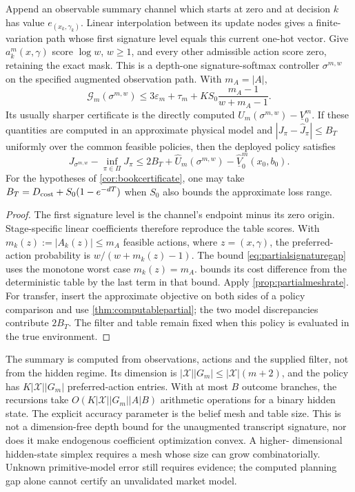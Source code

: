 \begin{corollary}
\label{cor:partialsignature}
Append an observable summary channel which starts at zero and at decision
$k$ has value $e_{(x_k,\gamma_k)}$. Linear interpolation between its update
nodes gives a finite-variation path whose first signature level equals this
current one-hot vector. Give $a_k^m(x,\gamma)$ score $\log w$, $w\ge1$,
and every other admissible action score zero, retaining the exact mask.
This is a depth-one signature-softmax controller $\sigma^{m,w}$ on the
specified augmented observation path. With $m_A=|A|$,
\begin{equation}\label{eq:partialsignaturegap}
 \mathcal G_m(\sigma^{m,w})
 \le3\varepsilon_m+\tau_m+
       KS_0\frac{m_A-1}{w+m_A-1}.
\end{equation}
Its usually sharper certificate is the directly computed
$U_m(\sigma^{m,w})-\underline V_0^m$.
If these quantities are computed in an approximate physical model and
$|J_\pi-\widehat J_\pi|\le B_T$ uniformly over the common feasible policies,
then the deployed policy satisfies
\begin{equation}\label{eq:partialtransfer}
 J_{\sigma^{m,w}}-\inf_{\pi\in\Pi}J_\pi
 \le 2B_T+\widehat U_m(\sigma^{m,w})-
                  \widehat{\underline V}_0^m(x_0,b_0).
\end{equation}
For the hypotheses of \cref{cor:bookcertificate}, one may take
$B_T=D_{\rm cost}+S_0(1-e^{-dT})$ when $S_0$ also bounds the approximate
loss range.
\end{corollary}
\begin{proof}
The first signature level is the channel's endpoint minus its zero origin.
Stage-specific linear coefficients therefore reproduce the table scores.
With $m_k(z):=|A_k(z)|\le m_A$ feasible actions, where $z=(x,\gamma)$,
the preferred-action probability is $w/(w+m_k(z)-1)$.
The bound \eqref{eq:partialsignaturegap} uses the monotone worst case
$m_k(z)=m_A$.  bounds its cost difference from the
deterministic table by the last term in that bound.
Apply \cref{prop:partialmeshrate}. For transfer, insert the approximate
objective on both sides of a policy comparison and use
\cref{thm:computablepartial}; the two model discrepancies contribute $2B_T$.
The filter and table remain fixed when this policy is evaluated in the true
environment.
\end{proof}

The summary is computed from observations, actions and the supplied filter,
not from the hidden regime. Its dimension is
$|\mathcal X||G_m|\le|\mathcal X|(m+2)$, and
the policy has $K|\mathcal X||G_m|$ preferred-action entries. With at most
$B$ outcome branches, the recursions take
$O(K|\mathcal X||G_m||A|B)$ arithmetic operations for a binary hidden state.
The explicit accuracy parameter is the belief mesh and table size. This is
not a dimension-free depth bound for the unaugmented transcript signature,
nor does it make endogenous coefficient optimization convex. A higher-
dimensional hidden-state simplex requires a mesh whose size can grow
combinatorially. Unknown primitive-model error still requires evidence;
the computed planning gap alone cannot certify an unvalidated market model.
